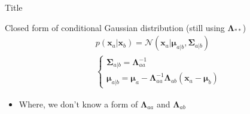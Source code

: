 \documentclass[10pt]{beamer}
\begin{document}
    
    \begin{frame}{Title}
        \begin{block}{Closed form of conditional Gaussian distribution (still using $\bm\Lambda_{**}$)}
            \begin{align*}
                 &p(\mathbf x_a | \mathbf x_b) = \mathcal N(\mathbf x_a | \bm \mu_{a|b}, \bm \Sigma_{a|b})  \\
                 &
                 \begin{cases}
                 \bm\Sigma_{a|b} = \bm\Lambda_{aa}^{-1} \\
                 \bm\mu_{a|b} = \bm\mu_a - \bm\Lambda_{aa}^{-1}\bm\Lambda_{ab}(\mathbf x_a - \bm\mu_b)
                 \end{cases}
            \end{align*}
        \end{block}
        \begin{itemize}
            \item Where, we don't know a form of $\bm\Lambda_{aa}$ and $\bm\Lambda_{ab}$
        \end{itemize}
    \end{frame}
    
\end{document}
